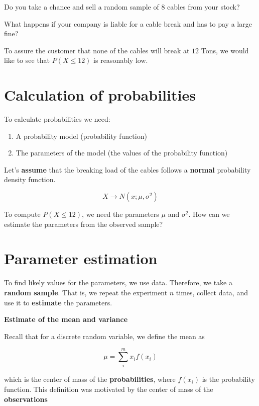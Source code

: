 \documentclass[
]{book}
\begin{document}
Do you take a chance and sell a random sample of \(8\) cables from your stock?

What happens if your company is liable for a cable break and has to pay a large fine?

To assure the customer that none of the cables will break at \(12\) Tons, we would like to see that \(P(X \leq 12)\) is reasonably low.

\hypertarget{calculation-of-probabilities}{%
\section{Calculation of probabilities}\label{calculation-of-probabilities}}

To calculate probabilities we need:

\begin{enumerate}
\def\labelenumi{\arabic{enumi}.}
\item
  A probability model (probability function)
\item
  The parameters of the model (the values of the probability function)
\end{enumerate}

Let's \textbf{assume} that the breaking load of the cables follows a \textbf{normal} probability density function.

\[X \rightarrow N(x; \mu, \sigma^2)\]

To compute \(P(X \leq 12)\), we need the parameters \(\mu\) and \(\sigma^2\). How can we estimate the parameters from the observed sample?

\hypertarget{parameter-estimation}{%
\section{Parameter estimation}\label{parameter-estimation}}

To find likely values for the parameters, we use data. Therefore, we take a \textbf{random sample}. That is, we repeat the experiment \(n\) times, collect data, and use it to \textbf{estimate} the parameters.

\textbf{Estimate of the mean and variance}

Recall that for a discrete random variable, we define the mean as

\[\mu=\sum_{i}^m x_if(x_i)\]

which is the center of mass of the \textbf{probabilities}, where \(f(x_i)\) is the probability function. This definition was motivated by the center of mass of the \textbf{observations}
\end{document}
